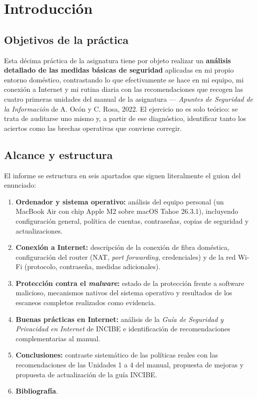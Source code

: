 \chapter{Introducción}

\section{Objetivos de la práctica}

Esta décima práctica de la asignatura tiene por objeto realizar un \textbf{análisis detallado de las medidas básicas de seguridad} aplicadas en mi propio entorno doméstico, contrastando lo que efectivamente se hace en mi equipo, mi conexión a Internet y mi rutina diaria con las recomendaciones que recogen las cuatro primeras unidades del manual de la asignatura --- \textit{Apuntes de Seguridad de la Información} de A. Ocón y C. Rosa, 2022. El ejercicio no es solo teórico: se trata de auditarse uno mismo y, a partir de ese diagnóstico, identificar tanto los aciertos como las brechas operativas que conviene corregir.

\section{Alcance y estructura}

El informe se estructura en seis apartados que siguen literalmente el guion del enunciado:
\begin{enumerate}[leftmargin=*]
    \item \textbf{Ordenador y sistema operativo:} análisis del equipo personal (un MacBook Air con chip Apple M2 sobre macOS Tahoe 26.3.1), incluyendo configuración general, política de cuentas, contraseñas, copias de seguridad y actualizaciones.
    \item \textbf{Conexión a Internet:} descripción de la conexión de fibra doméstica, configuración del router (NAT, \textit{port forwarding}, credenciales) y de la red Wi-Fi (protocolo, contraseña, medidas adicionales).
    \item \textbf{Protección contra el \textit{malware}:} estado de la protección frente a software malicioso, mecanismos nativos del sistema operativo y resultados de los escaneos completos realizados como evidencia.
    \item \textbf{Buenas prácticas en Internet:} análisis de la \textit{Guía de Seguridad y Privacidad en Internet} de INCIBE e identificación de recomendaciones complementarias al manual.
    \item \textbf{Conclusiones:} contraste sistemático de las políticas reales con las recomendaciones de las Unidades 1 a 4 del manual, propuesta de mejoras y propuesta de actualización de la guía INCIBE.
    \item \textbf{Bibliografía}.
\end{enumerate}


